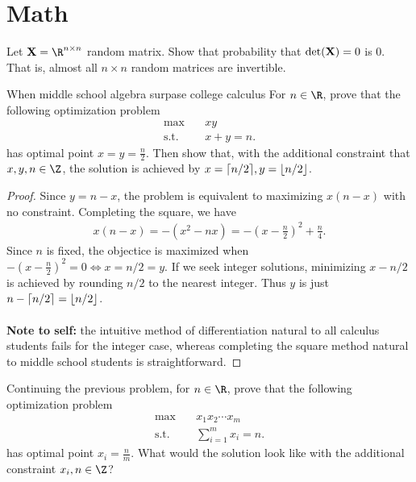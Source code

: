 \section{Math}

\begin{problembox}{}{}
Let $\bX = \R^{n \times n}$ random matrix. Show that probability that $\det(\mathbf{X}) = 0$ is $0$. That is, almost all $n \times n$ random matrices are invertible. 
\end{problembox}

\begin{problembox}{When middle school algebra surpase college calculus}{}
For $n \in \R$, prove that the following optimization problem
\begin{align*}
	\max &\quad xy\\
	\text{s.t.} & \quad x + y = n.
\end{align*}
has optimal point $x = y = \frac{n}{2}$. Then show that, with the additional constraint that $x, y, n \in \Z$, the solution is achieved by $x = \lceil n/2\rceil, y = \lfloor n/2\rfloor$. 
\end{problembox}

\begin{proof}
Since $y = n - x$, the problem is equivalent to maximizing $x(n - x)$ with no constraint. Completing the square, we have
\begin{align*}
	x(n - x) = -(x^2 - nx) = -\left(x - \frac{n}{2}\right)^2 + \frac{n}{4}.
\end{align*}
Since $n$ is fixed, the objectice is maximized when $-\left(x - \frac{n}{2}\right)^2 = 0 \iff x = n / 2 = y.$ If we seek integer solutions, minimizing $x - n/2$ is achieved by rounding $n/2$ to the nearest integer. Thus $y$ is just $n - \lceil n / 2\rceil = \lfloor n/2\rfloor$. \\
\\
\textbf{Note to self:} the intuitive method of differentiation natural to all calculus students fails for the integer case, whereas completing the square method natural to middle school students is straightforward. 
\end{proof}

\begin{problembox}{}{}
Continuing the previous problem, for $n \in \R$, prove that the following optimization problem
\begin{align*}
	\max &\quad x_1 x_2 \cdots x_m\\
	\text{s.t.} & \quad \sum_{i=1}^m x_i = n.
\end{align*}
has optimal point $x_i = \frac{n}{m}$. What would the solution look like with the additional constraint $x_i, n \in \Z$? 
\end{problembox}


